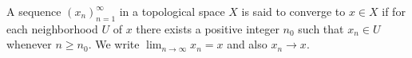 A sequence $(x_n)_{n=1}^{\infty}$ in a topological space $X$ is said to converge to $x \in X$ if for each neighborhood $U$ of $x$ there exists a positive integer $n_0$ such that $x_n \in U$ whenever $n \geq n_0$. We write $\lim_{n \to \infty} x_n = x$ and also $x_n \to x$.